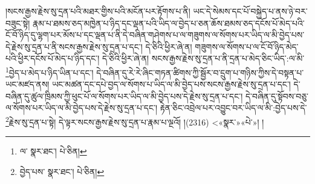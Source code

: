 །སངས་རྒྱས་རྗེས་སུ་དྲན་པའི་མཐར་གྱིས་པའི་མངོན་པར་རྟོགས་པ་ནི། ཡང་དེ་སེམས་དང་པོ་བསྐྱེད་པ་ནས་ཉེ་བར་བཟུང་སྟེ། རྣམ་པ་ཐམས་ཅད་མཁྱེན་པ་ཉིད་དང་ལྡན་པའི་ཡིད་ལ་བྱེད་པ་ཅན་ཆོས་ཐམས་ཅད་དངོས་པོ་མེད་པའི་ངོ་བོ་ཉིད་དུ་ལྷག་པར་མོས་པ་དང་ལྡན་པ་ནི་དེ་བཞིན་གཤེགས་པ་ལ་གཟུགས་ལ་སོགས་པར་ཡིད་ལ་མི་བྱེད་པས་དེ་རྗེས་སུ་དྲན་པ་ནི་སངས་རྒྱས་རྗེས་སུ་དྲན་པ་དང་། དེ་ཅིའི་ཕྱིར་ཞེ་ན། གཟུགས་ལ་སོགས་པ་ལ་ངོ་བོ་ཉིད་མེད་པའི་ཕྱིར་དངོས་པོ་མེད་པ་ཉིད་དང་། དེ་ཅིའི་ཕྱིར་ཞེ་ན། སངས་རྒྱས་རྗེས་སུ་དྲན་པ་ནི་དྲན་པ་མེད་ཅིང་ཡིད་:ལ་མི་\footnote{ལ་  སྣར་ཐང་།  པེ་ཅིན། }བྱེད་པ་མེད་པ་ཉིད་ཡིན་པ་དང་། དེ་བཞིན་དུ་རེ་རེ་ཞིང་གཏན་ཚིགས་ཀྱི་སྦྱོར་བ་དྲུག་པ་གཉིས་ཀྱིས་དེ་བསྟན་པ་ཡང་མཛད་ནས། ཡང་མཚན་དང་དཔེ་བྱད་ལ་སོགས་པ་ཡིད་ལ་མི་བྱེད་པས་སངས་རྒྱས་རྗེས་སུ་དྲན་པ་དང་། དེ་བཞིན་དུ་ཚུལ་ཁྲིམས་ཀྱི་ཕུང་པོ་ལ་སོགས་པར་ཡིད་ལ་མི་བྱེད་པས་དེ་རྗེས་སུ་དྲན་པ་དང་། དེ་བཞིན་དུ་སྟོབས་བཅུ་ལ་སོགས་པར་ཡིད་ལ་མི་བྱེད་པས་དེ་རྗེས་སུ་དྲན་པ་དང་། རྟེན་ཅིང་འབྲེལ་པར་འབྱུང་བར་ཡིད་ལ་མི་:བྱེད་པས་དེ་\footnote{བྱེད་པས་  སྣར་ཐང་།  པེ་ཅིན། }རྗེས་སུ་དྲན་པ་སྟེ། དེ་ལྟར་སངས་རྒྱས་རྗེས་སུ་དྲན་པ་རྣམ་པ་ལྔའོ། །(2316) <«སྣར་»«པེ་»། །

